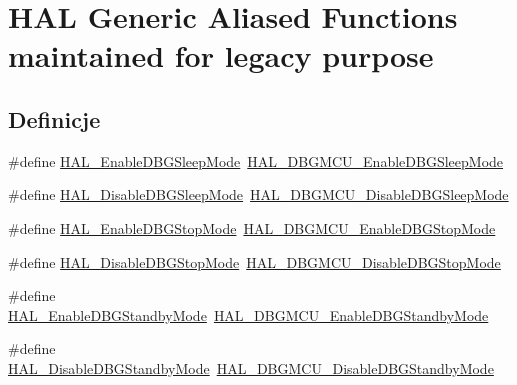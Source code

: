 \hypertarget{group___h_a_l___aliased___functions}{}\section{H\+AL Generic Aliased Functions maintained for legacy purpose}
\label{group___h_a_l___aliased___functions}
\subsection*{Definicje}
\begin{DoxyCompactItemize}
\item 
\#define \hyperlink{group___h_a_l___aliased___functions_ga334dab724209d848427632878cd18590}{H\+A\+L\+\_\+\+Enable\+D\+B\+G\+Sleep\+Mode}~\hyperlink{group___h_a_l___exported___functions___group2_gaf031bcc71ebad9b7edf405547efd762b}{H\+A\+L\+\_\+\+D\+B\+G\+M\+C\+U\+\_\+\+Enable\+D\+B\+G\+Sleep\+Mode}
\item 
\#define \hyperlink{group___h_a_l___aliased___functions_gadd190a639a43b5aa49cf3d773d6e877f}{H\+A\+L\+\_\+\+Disable\+D\+B\+G\+Sleep\+Mode}~\hyperlink{group___h_a_l___exported___functions___group2_gac7820d0561f19999a68d714655b901b5}{H\+A\+L\+\_\+\+D\+B\+G\+M\+C\+U\+\_\+\+Disable\+D\+B\+G\+Sleep\+Mode}
\item 
\#define \hyperlink{group___h_a_l___aliased___functions_ga5d8db04085885e06f167cb9e901bb729}{H\+A\+L\+\_\+\+Enable\+D\+B\+G\+Stop\+Mode}~\hyperlink{group___h_a_l___exported___functions___group2_gadf25043b17de4bef38a95a75fd03e5c4}{H\+A\+L\+\_\+\+D\+B\+G\+M\+C\+U\+\_\+\+Enable\+D\+B\+G\+Stop\+Mode}
\item 
\#define \hyperlink{group___h_a_l___aliased___functions_gaca227f80c71d94c0880bd681d68deb85}{H\+A\+L\+\_\+\+Disable\+D\+B\+G\+Stop\+Mode}~\hyperlink{group___h_a_l___exported___functions___group2_ga2c93dcee35e5983d74f1000de7c042d5}{H\+A\+L\+\_\+\+D\+B\+G\+M\+C\+U\+\_\+\+Disable\+D\+B\+G\+Stop\+Mode}
\item 
\#define \hyperlink{group___h_a_l___aliased___functions_ga829fe0c92393d65bcb65eb8b8f7bdc99}{H\+A\+L\+\_\+\+Enable\+D\+B\+G\+Standby\+Mode}~\hyperlink{group___h_a_l___exported___functions___group2_ga28a1323b2eeb0a408c1cfdbfa0db5ead}{H\+A\+L\+\_\+\+D\+B\+G\+M\+C\+U\+\_\+\+Enable\+D\+B\+G\+Standby\+Mode}
\item 
\#define \hyperlink{group___h_a_l___aliased___functions_gac17bfe5c0df5508f778b7f3784b9723a}{H\+A\+L\+\_\+\+Disable\+D\+B\+G\+Standby\+Mode}~\hyperlink{group___h_a_l___exported___functions___group2_ga7faa58d8508ea3123b9f247a70379779}{H\+A\+L\+\_\+\+D\+B\+G\+M\+C\+U\+\_\+\+Disable\+D\+B\+G\+Standby\+Mode}

\end{DoxyCompactItemize}
